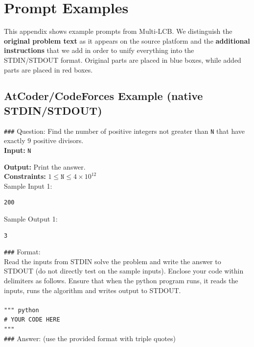 \documentclass{llmxive}
\begin{document}
\section{Prompt Examples}
\label{app_prompts}



This appendix shows example prompts from Multi-LCB. 
We distinguish the \textbf{original problem text} as it appears on the source platform and the \textbf{additional instructions} that we add in order to unify everything into the STDIN/STDOUT format. 
Original parts are placed in blue boxes, while added parts are placed in red boxes.



\subsection{AtCoder/CodeForces Example (native STDIN/STDOUT)}
\label{app_atcoder_prompts}

\begin{origtext}
\texttt{\#\#\#} Question:  
Find the number of positive integers not greater than \texttt{N} that have exactly $9$ positive divisors.\\

\textbf{Input:}  
\texttt{N} 

\textbf{Output:}  
Print the answer.\\  

\textbf{Constraints:}  
$1 \leq \texttt{N} \leq 4 \times 10^{12}$  \\

Sample Input 1: 
\begin{verbatim}
200  
\end{verbatim}
Sample Output 1:  
\begin{verbatim}
3
\end{verbatim}
\end{origtext}

\begin{addedtext}


\texttt{\#\#\#} Format: \\ 
Read the inputs from STDIN solve the problem and write the answer to STDOUT (do not directly test on the sample inputs). Enclose your code within delimiters as follows. Ensure that when the python program runs, it reads the inputs, runs the algorithm and writes output to STDOUT.\\
\\

\texttt{""" python } \\
\texttt{\# YOUR CODE HERE} \\
\texttt{"""} 
\\


\texttt{\#\#\#} Answer: (use the provided format with triple quotes)
\end{addedtext}
\end{document}
